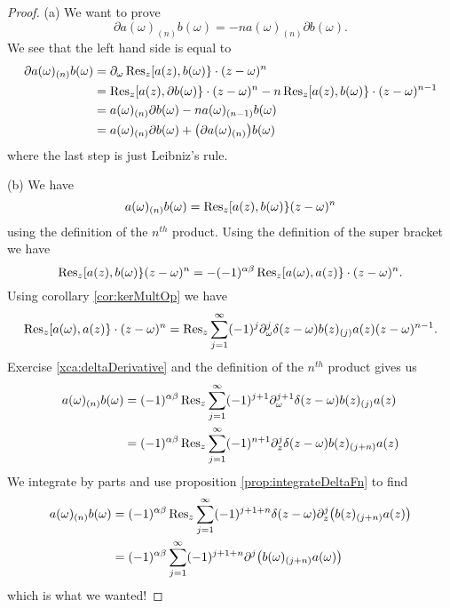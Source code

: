 \begin{proof}
(a)
We want to prove 
\begin{equation}
\partial a(\omega)_{(n)}b(\omega)=-na(\omega)_{(n)}\partial b(\omega).
\end{equation}
We see that the left hand side is equal to
\begin{subequations}
\begin{align}
\partial a(\omega)_{(n)}b(\omega)
&=\partial_{\omega}\Res[z]{\superb{a(z)}{b(\omega)}\cdot(z-\omega)^{n}}\\
&=\Res[z]{\superb{a(z)}{\partial b(\omega)}\cdot(z-\omega)^{n}}
-n\Res[z]{\superb{a(z)}{b(\omega)}\cdot(z-\omega)^{n-1}}\\
&=a(\omega)_{(n)}\partial b(\omega)-na(\omega)_{(n-1)}b(\omega)\\
&=a(\omega)_{(n)}\partial b(\omega)+\bigl(\partial
a(\omega)_{(n)}\bigr)b(\omega)
\end{align}
\end{subequations}
where the last step is just Leibniz's rule.

(b) We have
\begin{equation}
a(\omega)_{(n)}b(\omega)
= \Res[z]{\superb{a(z)}{b(\omega)}(z-\omega)^{n}}
\end{equation}
using the definition of the $n^{th}$ product. Using the definition of
the super bracket we have
\begin{equation}
\Res[z]{\superb{a(z)}{b(\omega)}(z-\omega)^{n}}=-(-1)^{\alpha\beta}\Res[z]{\superb{a(\omega)}{a(z)}\cdot(z-\omega)^{n}}.
\end{equation}
Using corollary \ref{cor:kerMultOp} we have
\begin{equation}
\Res[z]{\superb{a(\omega)}{a(z)}\cdot(z-\omega)^{n}}
=\Res[z]{\sum^{\infty}_{j=1}(-1)^{j}\partial_{\omega}^{j}\delta(z-\omega)b(z)_{(j)}a(z)(z-\omega)^{n-1}}.
\end{equation}
Exercise \ref{xca:deltaDerivative} and the definition of the $n^{th}$
product gives us
\begin{subequations}
\begin{align}
a(\omega)_{(n)}b(\omega)&=(-1)^{\alpha\beta}\Res[z]{\sum^{\infty}_{j=1}(-1)^{j+1}\partial_{\omega}^{j+1}\delta(z-\omega)b(z)_{(j)}a(z)}\\
&=(-1)^{\alpha\beta}\Res[z]{\sum^{\infty}_{j=1}(-1)^{n+1}\partial_{z}^{j}\delta(z-\omega)b(z)_{(j+n)}a(z)}
\end{align}
\end{subequations}
We integrate by parts and use proposition \ref{prop:integrateDeltaFn} to
find
\begin{subequations}
\begin{align}
a(\omega)_{(n)}b(\omega)
&=(-1)^{\alpha\beta}\Res[z]{\sum^{\infty}_{j=1}(-1)^{j+1+n}\delta(z-\omega)\partial_{z}^{j}\bigl(b(z)_{(j+n)}a(z)\bigr)}\\
&=(-1)^{\alpha\beta}\sum^{\infty}_{j=1}(-1)^{j+1+n}\partial^{j}\bigl(b(\omega)_{(j+n)}a(\omega)\bigr)
\end{align}
\end{subequations}
which is what we wanted!


\end{proof}
